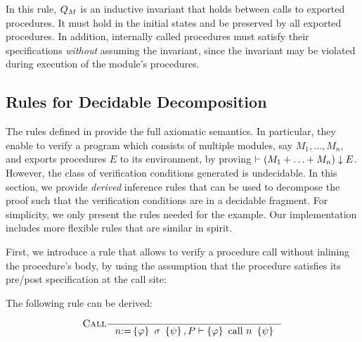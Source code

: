 \noindent In this rule, $Q_M$ is an inductive invariant that holds between calls to exported procedures.
It must hold in the initial states and be preserved by all exported procedures. In addition, internally called procedures must satisfy their specifications \emph{without} assuming the invariant, since the invariant may be violated during execution of the module's procedures.

\subsection{Rules for Decidable Decomposition}
\label{sec:theory}

The rules defined in  provide the full axiomatic semantics.
In particular, they enable to verify a program which consists of multiple modules, say $M_1,\ldots, M_n$,
and exports procedures $E$ to its environment, by proving
$\vdash (M_1 +\ldots + M_n) \downarrow E$.
However, the class of verification conditions generated is undecidable.
In this section, we provide \emph{derived} inference rules that can be used
to decompose the proof such that the verification conditions are in a decidable fragment.
For simplicity, we only present the rules needed for the {\Toy} example.
Our implementation includes more flexible rules that are similar in spirit.


First, we introduce a rule that allows to verify a procedure call without inlining the procedure's body,
by using the assumption that the procedure satisfies its pre/post specification at the call site:

\begin{theorem}
The following rule can be derived:
\begin{small}
\[\irule{Call}\inference{}
            {n \Asgn \bra{\phi} \sigma \ket{\psi}, P \vdash \bra{\phi} \mbox{\rm call $n$} \ket{\psi}}
\]
\end{small}
\end{theorem}

